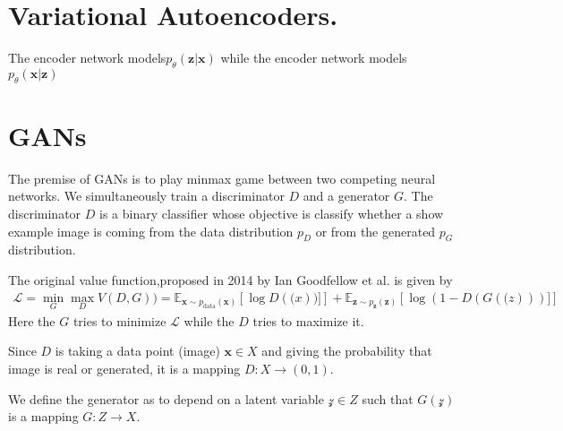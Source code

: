 \section{Variational Autoencoders.}
The encoder network models$p_\theta(\mathbf{z}|\mathbf{x})$ while the encoder network models $p_\theta(\mathbf{x}|\mathbf{z})$


\section{GANs}

The premise of GANs is to play minmax game between two competing neural networks. We simultaneously train a discriminator $D$ and a generator $G$.
The discriminator $D$ is a binary classifier whose objective is classify whether a show example image is coming from the data distribution $p_D$ or from the generated $p_G$ distribution.

The original value function,proposed in 2014 by Ian Goodfellow et al.\cite{gan} is given by
\begin{align}
\mathcal{L} = \min_G \max_D V(D,G))=\mathbb{E}_{\mathbf{x}\sim p_{\text{data}}(\mathbf{x})}
\left[\log D(\mathbf(x))]\right]+
\mathbb{E}_{\mathbf{z}\sim p_{\mathbf{z}}(\mathbf{z})}
\left[\log (1-D(G(\mathbf(z)))]\right]
\end{align}
Here the $G$ tries to minimize $\mathcal{L}$ while the $D$ tries to maximize it.

Since $D$ is taking a data point (image) $\mathbf{x}\in X$ and giving the probability that image is real or generated, it is a mapping $D:X \to (0,1)$.

We define the generator as to depend on a latent variable $\mathcal{z}\in Z$ such that $G(\mathcal{z})$ is a mapping $G:Z\to X$.





%
%
%

